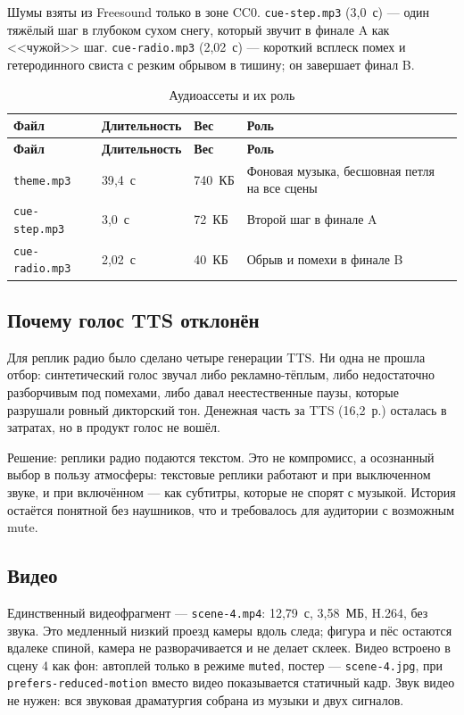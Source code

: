 \documentclass[12pt, a4paper]{article}
\begin{document}
Шумы взяты из Freesound только в зоне CC0. \texttt{cue-step.mp3} (3{,}0~с) --- один тяжёлый шаг в глубоком сухом снегу, который звучит в финале A как <<чужой>> шаг. \texttt{cue-radio.mp3} (2{,}02~с) --- короткий всплеск помех и гетеродинного свиста с резким обрывом в тишину; он завершает финал B.

\begin{small}
\setlength{\tabcolsep}{4pt}
\begin{longtable}{@{}L{4.0cm}L{2.2cm}L{2.0cm}L{6.8cm}@{}}
\caption{Аудиоассеты и их роль}\label{tab:audio}\\
\toprule
\textbf{Файл} & \textbf{Длительность} & \textbf{Вес} & \textbf{Роль} \\
\midrule
\endfirsthead
\toprule
\textbf{Файл} & \textbf{Длительность} & \textbf{Вес} & \textbf{Роль} \\
\midrule
\endhead
\bottomrule
\endlastfoot
\texttt{theme.mp3} & 39{,}4~с & 740~КБ & Фоновая музыка, бесшовная петля на все сцены \\
\addlinespace
\texttt{cue-step.mp3} & 3{,}0~с & 72~КБ & Второй шаг в финале A \\
\addlinespace
\texttt{cue-radio.mp3} & 2{,}02~с & 40~КБ & Обрыв и помехи в финале B \\
\end{longtable}
\end{small}

\subsection{Почему голос TTS отклонён}
Для реплик радио было сделано четыре генерации TTS. Ни одна не прошла отбор: синтетический голос звучал либо рекламно-тёплым, либо недостаточно разборчивым под помехами, либо давал неестественные паузы, которые разрушали ровный дикторский тон. Денежная часть за TTS (16{,}2~р.) осталась в затратах, но в продукт голос не вошёл.

Решение: реплики радио подаются текстом. Это не компромисс, а осознанный выбор в пользу атмосферы: текстовые реплики работают и при выключенном звуке, и при включённом --- как субтитры, которые не спорят с музыкой. История остаётся понятной без наушников, что и требовалось для аудитории с возможным mute.

\subsection{Видео}
Единственный видеофрагмент --- \texttt{scene-4.mp4}: 12{,}79~с, 3{,}58~МБ, H.264, без звука. Это медленный низкий проезд камеры вдоль следа; фигура и пёс остаются вдалеке спиной, камера не разворачивается и не делает склеек. Видео встроено в сцену 4 как фон: автоплей только в режиме \texttt{muted}, постер --- \texttt{scene-4.jpg}, при \texttt{prefers-reduced-motion} вместо видео показывается статичный кадр. Звук видео не нужен: вся звуковая драматургия собрана из музыки и двух сигналов.
\end{document}

